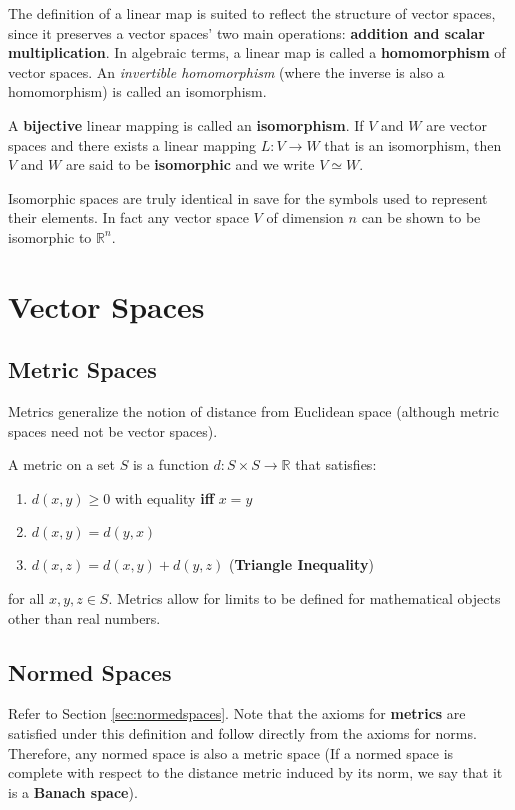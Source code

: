 \documentclass{article}
\begin{document}
The definition of a linear map is suited to reflect the structure of vector spaces, since it preserves a vector spaces' two main operations: \textbf{addition and scalar multiplication}. In algebraic terms, a linear map is called a \textbf{homomorphism} of vector spaces. An \textit{invertible homomorphism} (where the
inverse is also a homomorphism) is called an isomorphism.

\begin{definition}
    A \textbf{bijective} linear mapping is called an \textbf{isomorphism}. If $V$ and $W$ are vector spaces and there exists a linear mapping $L: V \rightarrow W$ that is an isomorphism, then $V$ and $W$ are said to be \textbf{isomorphic} and we write $V \simeq W$.  
\end{definition}

\noindent Isomorphic spaces are truly identical in save for the symbols used to represent their elements. In fact any vector space $V$ of dimension $n$ can be shown to be isomorphic to $\mathbb{R}^{n}$. \\

\section{Vector Spaces}

\subsection{Metric Spaces}
Metrics generalize the notion of distance from Euclidean space (although metric spaces need not be
vector spaces). 

\begin{definition}
    A metric on a set $S$ is a function $d: S \times S \rightarrow \mathbb{R}$ that satisfies:
    \begin{enumerate}
        \item $d(x, y) \geq 0$ with equality \textbf{iff} $x = y$
        \item $d(x,y) = d(y, x)$
        \item $d(x,z) = d(x, y) + d(y, z)$ (\textbf{Triangle Inequality})
    \end{enumerate}
\end{definition}

\noindent for all $x, y, z \in S$. Metrics allow for limits to be defined for mathematical objects other than real numbers. 

\subsection{Normed Spaces}
Refer to Section \ref{sec:normedspaces}. Note that the axioms for \textbf{metrics} are satisfied under this definition and follow directly from
the axioms for norms. Therefore, any normed space is also a metric space (If a normed space is complete with respect to the distance metric induced by its norm, we say that it is a \textbf{Banach space}). 
\end{document}

